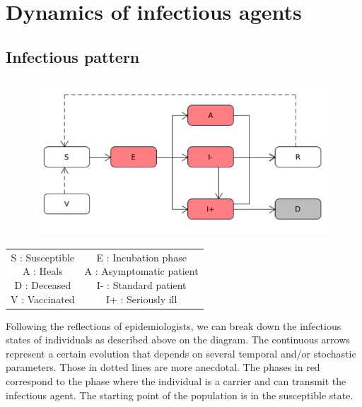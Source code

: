 \chapter{Dynamics of infectious agents}

\section{Infectious pattern}

\begin{figure}[h]
  \centering
  \includegraphics[width=\linewidth]{media/schema_infection.png}
  \caption{}
  \label{fig:schemainfection}
\end{figure}

\begin{tabular}{cc}
\parbox{0.5\linewidth}{S : Susceptible\\
A : Heals\\
D : Deceased\\
V : Vaccinated\\}
&
\parbox{0.5\linewidth}{E : Incubation phase\\
A : Asymptomatic patient\\
I- : Standard patient\\
I+ : Seriously ill\\}
\end{tabular}

\bigskip

Following the reflections of epidemiologists, we can break down the infectious  states of individuals as described above on the diagram. The continuous arrows represent a certain evolution that depends on several temporal and/or stochastic parameters. Those in dotted lines are more anecdotal. The phases in red correspond to the phase where the individual is a carrier and can transmit the infectious agent. The starting point of the population is in the susceptible state.\\

